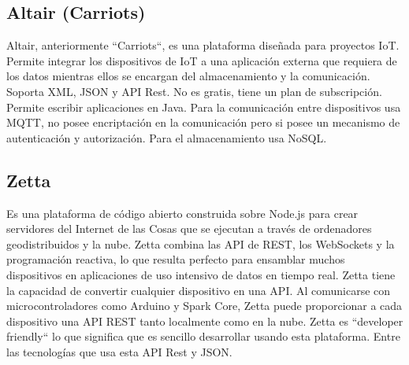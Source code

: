 {\subsection{Altair (Carriots)}

Altair, anteriormente ``Carriots``, es una plataforma diseñada para proyectos IoT. Permite integrar los dispositivos de IoT a una aplicación externa que requiera de los datos mientras ellos se encargan del almacenamiento y la comunicación. Soporta XML, JSON y API Rest. No es gratis, tiene un plan de subscripción. Permite escribir aplicaciones en Java. Para la comunicación entre dispositivos usa MQTT, no posee encriptación en la comunicación pero si posee un mecanismo de autenticación y autorización. Para el almacenamiento usa NoSQL. \cite{altair}

\subsection{Zetta}

Es una plataforma de código abierto construida sobre Node.js para crear servidores del Internet de las Cosas que se ejecutan a través de ordenadores geodistribuidos y la nube. Zetta combina las API de REST, los WebSockets y la programación reactiva, lo que resulta perfecto para ensamblar muchos dispositivos en aplicaciones de uso intensivo de datos en tiempo real. Zetta tiene la capacidad de convertir cualquier dispositivo en una API. Al comunicarse con microcontroladores como Arduino y Spark Core, Zetta puede proporcionar a cada dispositivo una API REST tanto localmente como en la nube. Zetta es ``developer friendly`` lo que significa que es sencillo desarrollar usando esta plataforma. Entre las tecnologías que usa esta API Rest y JSON. \cite{zetta}

}